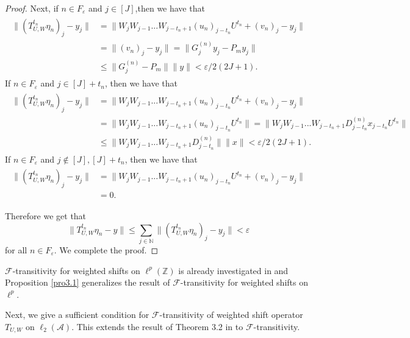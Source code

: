 \documentclass{article}
\begin{document}
\begin{proof}
Next, if $n\in F_{\varepsilon}$ and $j\in [J]$,then  we have that
\begin{eqnarray}\begin{split}\nonumber
\|(T^{t_{n}}_{U,W}\eta_{n})_{j}-y_{j}\|&=\|W_{j}W_{j-1}...W_{j-t_{n}+1}(u_{n})_{j-t_{n}}U^{t_{n}}+(v_{n})_{j}-y_{j}\|\\
&=\|(v_{n})_{j}-y_{j}\|=\|G^{(n)}_{j}y_{j}-P_{m}y_{j}\|\\
&\leq\|G^{(n)}_{j}-P_{m}\|\|y\|<\varepsilon/2(2J+1).
\end{split}\end{eqnarray}
If $n\in F_{\varepsilon}$ and $j\in [J]+t_{n}$, then we have that
\begin{eqnarray}\begin{split}\nonumber
\|(T^{t_{n}}_{U,W}\eta_{n})_{j}-y_{j}\|&=\|W_{j}W_{j-1}...W_{j-t_{n}+1}(u_{n})_{j-t_{n}}U^{t_{n}}+(v_{n})_{j}-y_{j}\|\\
&=\|W_{j}W_{j-1}...W_{j-t_{n}+1}(u_{n})_{j-t_{n}}U^{t_{n}}\|=\|W_{j}W_{j-1}...W_{j-t_{n}+1}D^{(n)}_{j-t_{n}}x_{j-t_{n}} U^{t_{n}}\|\\
&\leq\|W_{j}W_{j-1}...W_{j-t_{n}+1}D^{(n)}_{j-t_{n}}\|\|x\|<\varepsilon/2(2J+1).
\end{split}\end{eqnarray}
If $n\in F_{\varepsilon}$ and $j\notin [J], [J]+t_{n}$, then we have that
\begin{eqnarray}\begin{split}\nonumber
\|(T^{t_{n}}_{U,W}\eta_{n})_{j}-y_{j}\|&=\|W_{j}W_{j-1}...W_{j-t_{n}+1}(u_{n})_{j-t_{n}}U^{t_{n}}+(v_{n})_{j}-y_{j}\|\\
&=0.
\end{split}\end{eqnarray}

Therefore we get that
\[\|T^{t_{n}}_{U,W}\eta_{n}-y\|\leq\sum_{j\in\mathbb{N}}\|(T^{t_{n}}_{U,W}\eta_{n})_{j}-y_{j}\|<\varepsilon\]
for all $n\in F_{\varepsilon}$.
We complete the proof.

\end{proof}

$\mathcal{F}$-transitivity for weighted shifts on $\ell^{p}(\mathbb{Z})$ is already investigated in \cite{BMPP19} and Proposition \ref{pro3.1} generalizes the result of $\mathcal{F}$-transitivity for weighted shifts on $\ell^{p}$.


Next, we give a sufficient condition for $\mathcal{F}$-transitivity of weighted shift operator $T_{U, W}$ on $\ell_{2}(\mathcal{A})$. This extends the result of Theorem 3.2 in \cite{I24} to $\mathcal{F}$-transitivity.
\end{document}
